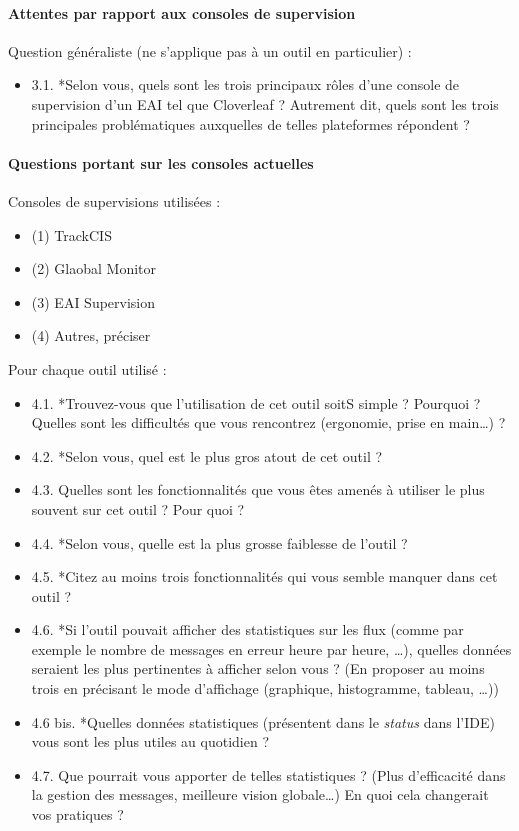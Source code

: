 	\paragraph{Attentes par rapport aux consoles de supervision}
	Question généraliste (ne s’applique pas à un outil en particulier) :
	\begin{itemize}
	  \item 3.1. *Selon vous, quels sont les trois principaux rôles d’une console
	  de supervision d’un EAI tel que Cloverleaf ? Autrement dit, quels sont les
	  trois principales problématiques auxquelles de telles plateformes répondent ?
	\end{itemize}
	
	\paragraph{Questions portant sur les consoles actuelles}
	Consoles de supervisions utilisées :
	\begin{itemize}
	  \item (1) TrackCIS
	  \item (2) Glaobal Monitor
	  \item (3) EAI Supervision
	  \item (4) Autres, préciser
	\end{itemize}
	Pour chaque outil utilisé :
	\begin{itemize}
	  \item 4.1. *Trouvez-vous que l’utilisation de cet outil soitS simple ?
	  Pourquoi ? Quelles sont les difficultés que vous rencontrez (ergonomie, prise en main…) ?
	  \item 4.2. *Selon vous, quel est le plus gros atout de cet outil ?
	  \item 4.3. Quelles sont les fonctionnalités que vous êtes amenés à utiliser le
	  plus souvent sur cet outil ? Pour quoi ?
	  \item 4.4. *Selon vous, quelle est la plus grosse faiblesse de l’outil ?
	  \item 4.5. *Citez au moins trois fonctionnalités qui vous semble manquer dans
	  cet outil ?
	  \item 4.6. *Si l’outil pouvait afficher des statistiques sur les flux (comme
	  par exemple le nombre de messages en erreur heure par heure, …), quelles
	  données seraient les plus pertinentes à afficher selon vous ? (En proposer au
	  moins trois en précisant le mode d’affichage (graphique, histogramme,
	  tableau, …))
	  \item 4.6 bis. *Quelles données statistiques (présentent dans le
	  \textit{status} dans l’IDE) vous sont les plus utiles au quotidien ?
	  \item 4.7. Que pourrait vous apporter de telles statistiques ? (Plus
	  d’efficacité dans la gestion des messages, meilleure vision globale…) En quoi
	  cela changerait vos pratiques ?
	\end{itemize}
	
